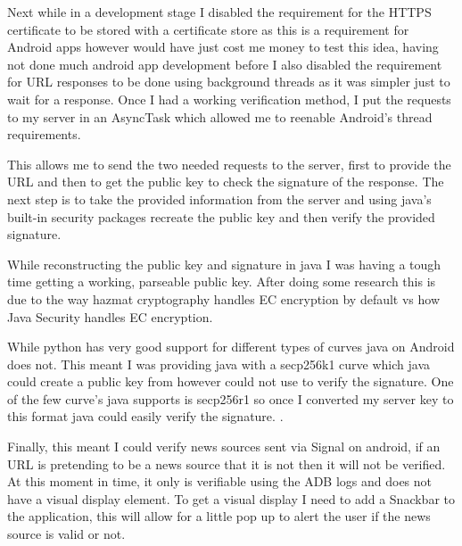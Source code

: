 \documentclass[11pt,a4paper]{report}
\begin{document}
Next while in a development stage I disabled the requirement for the HTTPS certificate to be stored with a certificate store as this is a requirement for Android apps however would have just cost me money to test this idea, having not done much android app development before I also disabled the requirement for URL responses to be done using background threads as it was simpler just to wait for a response. Once I had a working verification method, I put the requests to my server in an AsyncTask which allowed me to reenable Android’s thread requirements. 

This allows me to send the two needed requests to the server, first to provide the URL and then to get the public key to check the signature of the response. The next step is to take the provided information from the server and using java’s built-in security packages recreate the public key and then verify the provided signature.

While reconstructing the public key and signature in java I was having a tough time getting a working, parseable public key. After doing some research this is due to the way hazmat cryptography handles EC encryption by default vs how Java Security handles EC encryption.

While python has very good support for different types of curves java on Android does not. This meant I was providing java with a secp256k1 curve which java could create a public key from however could not use to verify the signature. One of the few curve’s java supports is secp256r1 so once I converted my server key to this format java could easily verify the signature. \citep{Exception}.

Finally, this meant I could verify news sources sent via Signal on android, if an URL is pretending to be a news source that it is not then it will not be verified. At this moment in time, it only is verifiable using the ADB logs and does not have a visual display element. To get a visual display I need to add a Snackbar to the application, this will allow for a little pop up to alert the user if the news source is valid or not.
\newpage
\end{document}
